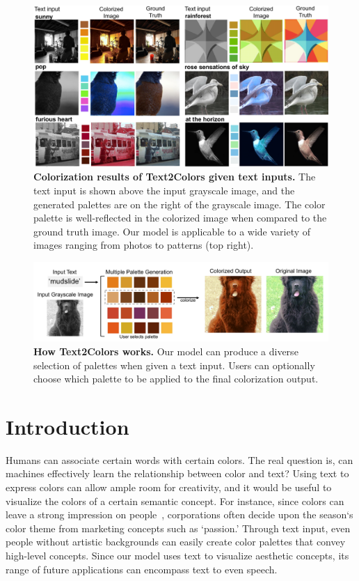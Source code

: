 \documentclass[runningheads]{llncs}
\begin{document}
\begin{figure}[t]
\centering
\includegraphics[width=\textwidth]{./cover.png}
\caption{\textbf{Colorization results of Text2Colors given text inputs.} The text input is shown above the input grayscale image, and the generated palettes are on the right of the grayscale image. The color palette is well-reflected in the colorized image when compared to the ground truth image. Our model is applicable to a wide variety of images ranging from photos to patterns (top right).}\label{fig:}
\end{figure}

\begin{figure}[t]
\centering
\includegraphics[width=\textwidth]{./qualitative.png}
\caption{\textbf{How Text2Colors works.} Our model can produce a diverse selection of palettes when given a text input. Users can optionally choose which palette to be applied to the final colorization output.}\label{fig:cover}
\end{figure}


\section{Introduction}
Humans can associate certain words with certain colors. The real question is, can machines effectively learn the relationship between color and text? Using text to express colors can allow ample room for creativity, and it would be useful to visualize the colors of a certain semantic concept. For instance, since colors can leave a strong impression on people~\cite{labrecque2012exciting}, corporations often decide upon the season`s color theme from marketing concepts such as `passion.' Through text input, even people without artistic backgrounds can easily create color palettes that convey high-level concepts. Since our model uses text to visualize aesthetic concepts, its range of future applications can encompass text to even speech. 
\end{document}
